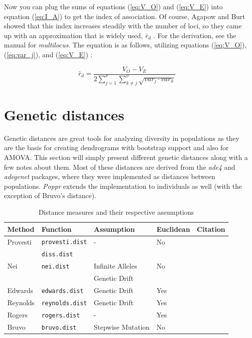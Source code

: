 \documentclass[letterpaper]{article}\usepackage[]{graphicx}\usepackage[]{color}
\newcommand{\Poppr}{\textit{Poppr}}
\newcommand{\adegenet}{\textit{adegenet}}
\begin{document}
Now you can plug the sums of equations (\ref{eq:V_O}) and (\ref{eq:V_E}) into
equation (\ref{eq:I_A}) to get the index of association. Of course, Agapow and
Burt showed that this index increases steadily with the number of loci, so they
came up with an approximation that is widely used, $\bar r_d$
\citep{Agapow:2001}. For the derivation, see the manual for \textit{multilocus}.
The equation is as follows, utilizing equations (\ref{eq:V_O}),
(\ref{eq:var_j}), and (\ref{eq:V_E}) \citep{Agapow:2001}:

\begin{equation}
\label{eq:r_d}
\bar{r}_d = \frac{V_O - V_E}
{2\displaystyle \sum_{j=1}^{\nu}\displaystyle \sum_{k \neq j}^{\nu}\sqrt{var_j\cdot{}var_k}}
\end{equation}

\section{Genetic distances}

Genetic distances are great tools for analyzing diversity in
populations as they are the basis for creating dendrograms with bootstrap
support and also for AMOVA. This section will simply present different genetic
distances along with a few notes about them. Most of these distances are derived
from the \textit{ade4} and \adegenet{} packages, where they were implemented as
distances between populations. \Poppr{} extends the implementation to individuals
as well (with the exception of Bruvo's distance).

\begin{table}[ht]
\centering
\caption{Distance measures and their respective assumptions}
\begin{tabular}{lllll}
  \hline
 Method & Function & Assumption & Euclidean & Citation\\ 
  \hline
Provesti & \texttt{provesti.dist} & - & No & \citep{prevosti1975distances}\\
 & \texttt{diss.dist} & & & \\
Nei & \texttt{nei.dist} & Infinite Alleles & No & \citep{nei1972genetic, nei1978estimation}\\
 & & Genetic Drift & & \\
Edwards & \texttt{edwards.dist} & Genetic Drift & Yes & \citep{edwards1971distances}\\
Reynolds & \texttt{reynolds.dist} & Genetic Drift & Yes & \citep{reynolds1983estimation}\\
Rogers & \texttt{rogers.dist} & - & Yes & \citep{rogers1972measures}\\
Bruvo & \texttt{bruvo.dist} & Stepwise Mutation & No & \citep{Bruvo:2004}\\
   \hline
\end{tabular}
\end{table}
\end{document}

